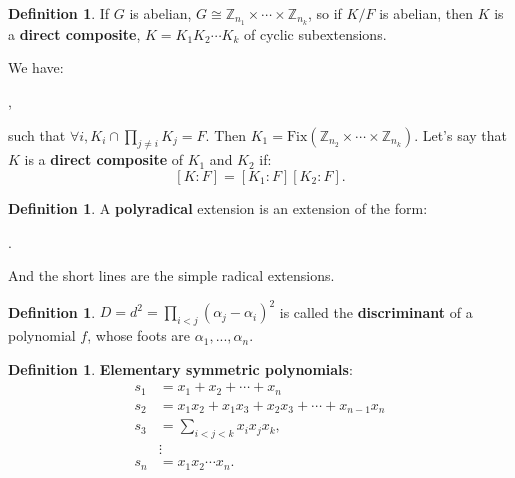 \documentclass[9pt,reqno,twoside]{amsbook}
\theoremstyle{plain}
\numberwithin{section}{chapter}
\numberwithin{equation}{chapter}
\theoremstyle{definition}
\newtheorem{Def}[theorem]{Definition}
\theoremstyle{remark}
\theoremstyle{plain}
\newcommand{\z}{\mathbb{Z}}
\newcommand{\bee}{\begin{equation}\begin{aligned}}
\newcommand{\eee}{\end{aligned}\end{equation}}
\newcommand{\fix}{\mathrm{Fix}}
\begin{document}
 \begin{Def}
 If $G$ is abelian, $G \cong \z_{n_1} \times \cdots \times \z_{n_k}$, so if $K/F$ is abelian, then $K$ is a \textbf{direct composite}, $K = K_1K_2\cdots K_k$ of cyclic subextensions. 

 
 We have:
 \begin{center}
 ,
 \end{center}
 such that $\forall i, K_i \cap \prod_{j \neq i}K_j = F$. Then $K_1 = \fix(\z_{n_2}\times \cdots \times \z_{n_k})$. Let's say that $K$ is a \textbf{direct composite} of $K_1$ and $K_2$ if:
$$
 [K:F] = [K_1:F][K_2:F].
$$
 
  \end{Def}

\begin{Def}
A \textbf{polyradical }extension is an extension of the form:
\begin{center}
.
\end{center}
And the short lines are the simple radical extensions. 
\end{Def}

\begin{Def}
$D = d^2 = \prod_{i < j}(\alpha_j - \alpha_i)^2$ is called the \textbf{discriminant} of a polynomial $f$, whose foots are $\alpha_1,...,\alpha_n$. 
\end{Def}

\begin{Def}
\textbf{Elementary symmetric polynomials}: 
\bee
s_1 &= x_1 + x_2 + \cdots + x_n\\
s_2 &= x_1x_2 + x_1x_3 + x_2x_3 + \cdots + x_{n - 1}x_n\\
s_3 &= \sum_{i < j < k}x_ix_jx_k,\\
& \vdots\\
s_n &= x_1x_2\cdots x_n. 
\eee
\end{Def}
\end{document}

